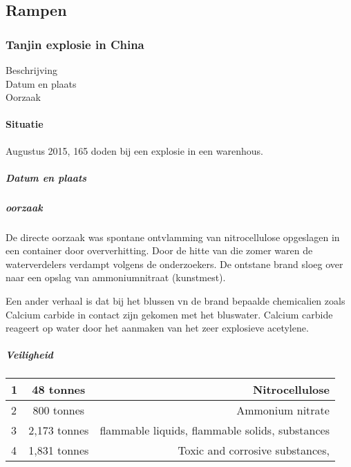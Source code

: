 \documentclass{article}
\begin{document}
\subsection{Rampen}






\subsubsection{Tanjin explosie in China}
\begin{description}
\item[Beschrijving]
\item[Datum en plaats] 
\item[Oorzaak]
\end{description}


\paragraph{Situatie}
Augustus 2015, 165 doden bij een explosie in een warenhous.

\subparagraph{Datum en plaats}

\subparagraph{oorzaak}
De directe oorzaak was spontane ontvlamming van nitrocellulose  opgeslagen in een container door oververhitting. Door de hitte van die zomer waren de waterverdelers verdampt volgens de onderzoekers. De ontstane  brand sloeg over naar een opslag van ammoniumnitraat (kunstmest).

Een ander verhaal is dat bij het blussen vn de brand bepaalde chemicalien zoals Calcium carbide in contact zijn gekomen met het bluswater. Calcium carbide reageert op water door het aanmaken van het zeer explosieve acetylene.



\subparagraph{Veiligheid}
	
	
     

	
\begin{center}
  \begin{tabular}{ l | c || r | }
    \hline
    1 & 48 tonnes &  Nitrocellulose \\ \hline
    2 & 800 tonnes &  Ammonium nitrate \\ \hline
    3 & 2,173 tonnes  &  flammable liquids, flammable solids, substances\\   %
4 & 1,831 tonnes  &  Toxic and corrosive substances,  \\  %
    \hline
  \end{tabular}
\end{center}
\end{document}
